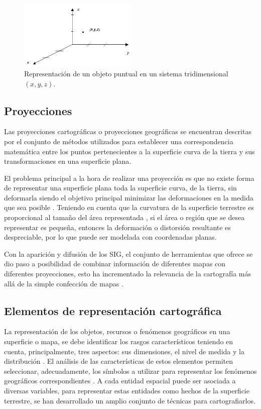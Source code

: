 \begin{figure}
\centering
\includegraphics[width=0.5\textwidth]{capitulo-2/graphics/coordenadas-xyz.jpg}
\caption{\label{fig:sig-xyz} Representación de un objeto puntual en un sistema tridimensional
 $(x,y,z)$.}
\end{figure}

\subsection{Proyecciones}
Las proyecciones cartográficas o proyecciones geográficas se encuentran descritas por el conjunto
de métodos utilizados para establecer una correspondencia matemática entre los puntos pertenecientes a la superficie curva de la tierra y sus transformaciones en una superficie plana.

El problema principal a la hora de realizar una proyección es que no existe forma de representar
una superficie plana toda la superficie curva, de la tierra, sin deformarla siendo el objetivo
principal minimizar las deformaciones en la medida que sea posible \citep{fAlonsoSig2006}.
Teniendo en cuenta que la curvatura de la superficie terrestre es proporcional al tamaño del área
representada \citep{llopis2006sistemas}, si el área o región que se desea representar es pequeña,
entonces la deformación o distorsión resultante es despreciable, por lo que puede ser modelada con
coordenadas planas.

Con la aparición y difusión de los SIG, el conjunto de herramientas que ofrece se dio paso a
posibilidad de combinar información de diferentes mapas con diferentes proyecciones, esto ha
incrementado la relevancia de la cartografía más allá de la simple confección de mapas
\citep{llopis2006sistemas}.

\subsection{Elementos de representación cartográfica}
La representación de los objetos, recursos o fenómenos geográficos en una superficie o mapa, se
debe identificar los rasgos característicos teniendo en cuenta, principalmente, tres aspectos:
sus dimensiones, el nivel de medida y la distribución \citep{fomentoConceptos2010}. El análisis de
las características de estos elementos permiten seleccionar, adecuadamente, los símbolos a
utilizar para representar los fenómenos geográficos correspondientes \citep{fomentoConceptos2010}.
A cada entidad espacial puede ser asociada a diversas variables, para representar estas entidades
como hechos de la superficie terrestre, se han desarrollado un amplio conjunto de técnicas para
cartografiarlos.

